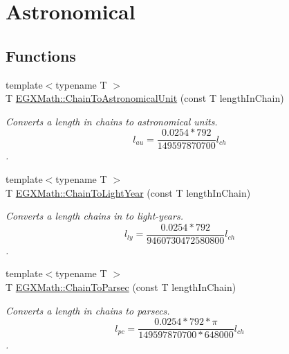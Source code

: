 \hypertarget{group___e_g_x_math-_conversions-_length_conversions-_surveyors-_chain-_astronomical}{}\section{Astronomical}
\label{group___e_g_x_math-_conversions-_length_conversions-_surveyors-_chain-_astronomical}
\subsection*{Functions}
\begin{DoxyCompactItemize}
\item 
{\footnotesize template$<$typename T $>$ }\\T \mbox{\hyperlink{group___e_g_x_math-_conversions-_length_conversions-_surveyors-_chain-_astronomical_ga5fd3b01f376172581a8847b593d33466}{E\+G\+X\+Math\+::\+Chain\+To\+Astronomical\+Unit}} (const T length\+In\+Chain)
\begin{DoxyCompactList}\small\item\em Converts a length in chains to astronomical units. \[ l_{au}=\frac{0.0254 * 792}{149597870700} l_{ch} \]. \end{DoxyCompactList}\item 
{\footnotesize template$<$typename T $>$ }\\T \mbox{\hyperlink{group___e_g_x_math-_conversions-_length_conversions-_surveyors-_chain-_astronomical_ga0414df8660b7f8fd74f32b0d88c3476f}{E\+G\+X\+Math\+::\+Chain\+To\+Light\+Year}} (const T length\+In\+Chain)
\begin{DoxyCompactList}\small\item\em Converts a length chains in to light-\/years. \[ l_{ly}=\frac{0.0254 * 792}{9460730472580800} l_{ch} \]. \end{DoxyCompactList}\item 
{\footnotesize template$<$typename T $>$ }\\T \mbox{\hyperlink{group___e_g_x_math-_conversions-_length_conversions-_surveyors-_chain-_astronomical_gad5475701b576e1f8609e04610024dda2}{E\+G\+X\+Math\+::\+Chain\+To\+Parsec}} (const T length\+In\+Chain)
\begin{DoxyCompactList}\small\item\em Converts a length in chains to parsecs. \[ l_{pc}=\frac{0.0254 * 792 * \pi}{149597870700 * 648000} l_{ch} \]. \end{DoxyCompactList}\end{DoxyCompactItemize}


